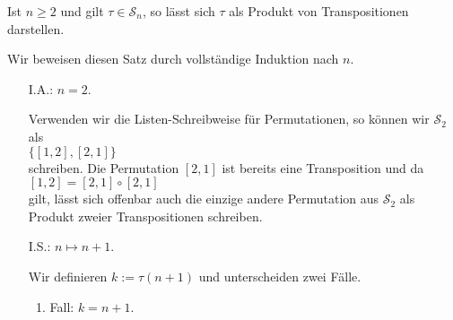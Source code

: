 \begin{Satz} \label{satz:produkt-von-transpositionen}
  Ist $n \geq 2$ und gilt $\tau \in \mathcal{S}_n$, so l\"asst sich $\tau$ als Produkt von Transpositionen darstellen.
\end{Satz}

\proof
Wir beweisen diesen Satz durch vollst\"andige Induktion nach $n$.
\begin{enumerate}
\item[I.A.:] $n = 2$.
           
             Verwenden wir die Listen-Schreibweise f\"ur Permutationen, so k\"onnen wir $\mathcal{S}_2$ als
             \\[0.2cm]
             \hspace*{1.3cm}
             $\{ [1,2], [2,1] \}$
             \\[0.2cm]
             schreiben.  Die Permutation $[2,1]$ ist bereits eine Transposition und da 
             \\[0.2cm]
             \hspace*{1.3cm}
             $[1,2] = [2,1] \circ [2,1]$
             \\[0.2cm]
             gilt, l\"asst sich offenbar auch die einzige andere Permutation aus $\mathcal{S}_2$ als Produkt
             zweier Transpositionen schreiben. 
\item[I.S.:] $n \mapsto n + 1$.

             Wir definieren $k := \tau(n+1)$ und unterscheiden zwei F\"alle.
             \renewcommand{\labelenumii}{\arabic{enumii}.}
             \begin{enumerate}
             \item Fall: $k = n+1$.
               

\end{enumerate}
\end{enumerate}
